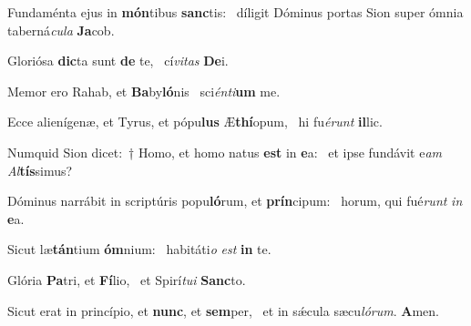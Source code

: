 \item Fundaménta ejus in \textbf{món}tibus \textbf{sanc}tis:~\psstar{} díligit Dóminus portas Sion super ómnia taberná\textit{cula} \textbf{Ja}cob.
\item Gloriósa \textbf{dic}ta sunt \textbf{de} te,~\psstar{} cí\textit{vitas} \textbf{De}i.
\item Memor ero Rahab, et \textbf{Ba}by\textbf{ló}nis~\psstar{} sci\textit{énti}\textbf{um} me.
\item Ecce alienígenæ, et Tyrus, et pópu\textbf{lus} Æ\textbf{thí}opum,~\psstar{} hi fu\textit{érunt} \textbf{il}lic.
\item Numquid Sion dicet:~† Homo, et homo natus \textbf{est} in \textbf{e}a:~\psstar{} et ipse fundávit e\textit{am} \textit{Al}\textbf{tís}simus?
\item Dóminus narrábit in scriptúris popu\textbf{ló}rum, et \textbf{prín}cipum:~\psstar{} horum, qui fué\textit{runt} \textit{in} \textbf{e}a.
\item Sicut læ\textbf{tán}tium \textbf{óm}nium:~\psstar{} habitáti\textit{o} \textit{est} \textbf{in} te.
\item Glória \textbf{Pa}tri, et \textbf{Fí}lio,~\psstar{} et Spirí\textit{tui} \textbf{Sanc}to.
\item Sicut erat in princípio, et \textbf{nunc}, et \textbf{sem}per,~\psstar{} et in sǽcula sæcu\textit{lórum}. \textbf{A}men.